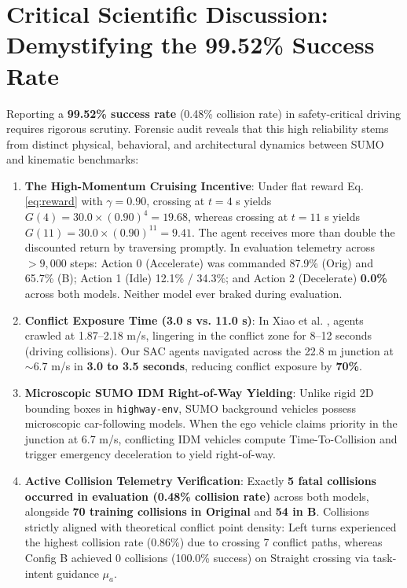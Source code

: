 \section{Critical Scientific Discussion: Demystifying the 99.52\% Success Rate}
\label{sec:demystifying_100}
Reporting a \textbf{99.52\% success rate} (0.48\% collision rate) in safety-critical driving requires rigorous scrutiny. Forensic audit reveals that this high reliability stems from distinct physical, behavioral, and architectural dynamics between SUMO and kinematic benchmarks:
\begin{enumerate}
    \setlength{\itemsep}{0pt}\setlength{\parskip}{0pt}
    \item \textbf{The High-Momentum Cruising Incentive}: Under flat reward Eq. \ref{eq:reward} with $\gamma = 0.90$, crossing at $t = 4$ s yields $G(4) = 30.0 \times (0.90)^4 = 19.68$, whereas crossing at $t = 11$ s yields $G(11) = 30.0 \times (0.90)^{11} = 9.41$. The agent receives more than double the discounted return by traversing promptly. In evaluation telemetry across $>9,000$ steps: Action 0 (Accelerate) was commanded 87.9\% (Orig) and 65.7\% (B); Action 1 (Idle) 12.1\% / 34.3\%; and Action 2 (Decelerate) \textbf{0.0\%} across both models. Neither model ever braked during evaluation.
    \item \textbf{Conflict Exposure Time (3.0 s vs. 11.0 s)}: In Xiao et al. \cite{xiao2024decision}, agents crawled at 1.87--2.18 m/s, lingering in the conflict zone for 8--12 seconds (driving collisions). Our SAC agents navigated across the 22.8 m junction at $\sim 6.7$ m/s in \textbf{3.0 to 3.5 seconds}, reducing conflict exposure by \textbf{70\%}.
    \item \textbf{Microscopic SUMO IDM Right-of-Way Yielding}: Unlike rigid 2D bounding boxes in \texttt{highway-env}, SUMO background vehicles possess microscopic car-following models. When the ego vehicle claims priority in the junction at 6.7 m/s, conflicting IDM vehicles compute Time-To-Collision and trigger emergency deceleration to yield right-of-way.
    \item \textbf{Active Collision Telemetry Verification}: Exactly \textbf{5 fatal collisions occurred in evaluation (0.48\% collision rate)} across both models, alongside \textbf{70 training collisions in Original} and \textbf{54 in B}. Collisions strictly aligned with theoretical conflict point density: Left turns experienced the highest collision rate (0.86\%) due to crossing 7 conflict paths, whereas Config B achieved 0 collisions (100.0\% success) on Straight crossing via task-intent guidance $\mu_a$.
\end{enumerate}

